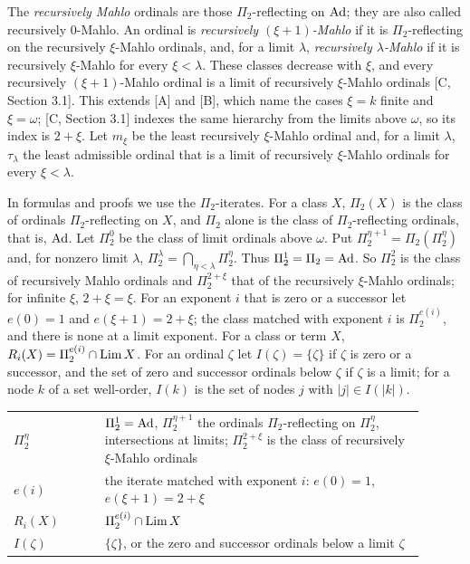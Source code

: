 \documentclass[11pt]{article}
\begin{document}
The \emph{recursively Mahlo} ordinals are those $\Pi_2$-reflecting on $\mathrm{Ad}$; they are also called recursively
$0$-Mahlo. An ordinal is \emph{recursively $(\xi+1)$-Mahlo} if it is $\Pi_2$-reflecting on the recursively $\xi$-Mahlo
ordinals, and, for a limit $\lambda$, \emph{recursively $\lambda$-Mahlo} if it is recursively $\xi$-Mahlo for every $\xi
< \lambda$. These classes decrease with $\xi$, and every recursively $(\xi+1)$-Mahlo ordinal is a limit of recursively
$\xi$-Mahlo ordinals [C, Section 3.1]. This extends [A] and [B], which name the cases $\xi = k$ finite and $\xi =
\omega$; [C, Section 3.1] indexes the same hierarchy from the limits above $\omega$, so its index is $2+\xi$. Let $m_\xi$ be the least
recursively $\xi$-Mahlo ordinal and, for a limit $\lambda$, $\tau_\lambda$ the least admissible ordinal that is a limit of
recursively $\xi$-Mahlo ordinals for every $\xi < \lambda$.

In formulas and proofs we use the $\Pi_2$-iterates. For a class $X$, $\Pi_2(X)$ is the class of ordinals
$\Pi_2$-reflecting on $X$, and $\Pi_2$ alone is the class of $\Pi_2$-reflecting ordinals, that is, $\mathrm{Ad}$. Let $\Pi_2^0$ be the class of limit ordinals above $\omega$. Put
$\Pi_2^{\eta+1} = \Pi_2(\Pi_2^\eta)$ and, for nonzero limit $\lambda$, $\Pi_2^\lambda = \bigcap_{\eta<\lambda} \Pi_2^\eta$.
Thus $\Pi_2^1 = \Pi_2 = \mathrm{Ad}$. So
$\Pi_2^2$ is the class of recursively Mahlo ordinals and $\Pi_2^{2+\xi}$ that of the recursively $\xi$-Mahlo ordinals;
for infinite $\xi$, $2+\xi = \xi$. For an exponent $i$ that is zero or a successor let $e(0) = 1$ and $e(\xi+1) =
2+\xi$; the class matched with exponent $i$ is $\Pi_2^{e(i)}$, and there is none at a limit exponent. For a class or term $X$, $R_i(X) = \Pi_2^{e(i)} \cap \mathrm{Lim}\, X$. For an ordinal $\zeta$ let $I(\zeta) = \{\zeta\}$ if
$\zeta$ is zero or a successor, and the set of zero and successor ordinals below $\zeta$ if $\zeta$ is a limit; for a
node $k$ of a set well-order, $I(k)$ is the set of nodes $j$ with $|j| \in I(|k|)$.

\begin{center}\begin{tabular}{p{0.2\linewidth}p{0.7\linewidth}}
\toprule
$\Pi_2^\eta$ & $\Pi_2^1 = \mathrm{Ad}$, $\Pi_2^{\eta+1}$ the ordinals $\Pi_2$-reflecting on $\Pi_2^\eta$, intersections at
limits; $\Pi_2^{2+\xi}$ is the class of recursively $\xi$-Mahlo ordinals \\
$e(i)$ & the iterate matched with exponent $i$: $e(0) = 1$, $e(\xi+1) = 2+\xi$ \\
$R_i(X)$ & $\Pi_2^{e(i)} \cap \mathrm{Lim}\, X$ \\
$I(\zeta)$ & $\{\zeta\}$, or the zero and successor ordinals below a limit $\zeta$ \\
\bottomrule
\end{tabular}\end{center}
\end{document}
